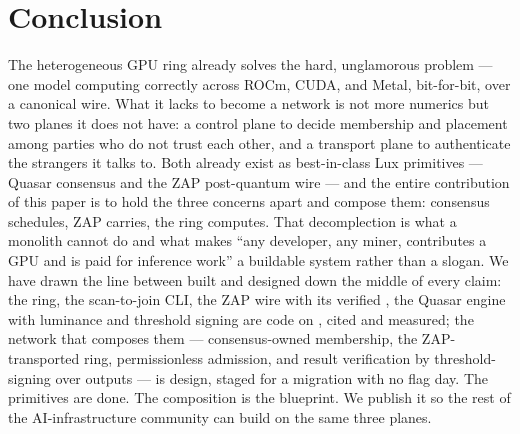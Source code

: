 \documentclass[11pt]{article}
\begin{document}
\section{Conclusion}
\label{sec:conclusion}

The heterogeneous GPU ring already solves the hard, unglamorous problem --- one model computing
correctly across ROCm, CUDA, and Metal, bit-for-bit, over a canonical wire. What it lacks to
become a network is not more numerics but two planes it does not have: a control plane to decide
membership and placement among parties who do not trust each other, and a transport plane to
authenticate the strangers it talks to. Both already exist as best-in-class Lux primitives ---
Quasar consensus and the ZAP post-quantum wire --- and the entire contribution of this paper is
to hold the three concerns apart and compose them: consensus schedules, ZAP carries, the ring
computes. That decomplection is what a monolith cannot do and what makes ``any developer, any
miner, contributes a GPU and is paid for inference work'' a buildable system rather than a slogan.
We have drawn the line between built and designed down the middle of every claim: the ring, the
scan-to-join CLI, the ZAP wire with its verified , the Quasar engine with luminance
and threshold signing are code on , cited and measured; the network that composes them
--- consensus-owned membership, the ZAP-transported ring, permissionless admission, and result
verification by threshold-signing over outputs --- is design, staged for a migration with no flag
day. The primitives are done. The composition is the blueprint. We publish it so the rest of the
AI-infrastructure community can build on the same three planes.
\end{document}
